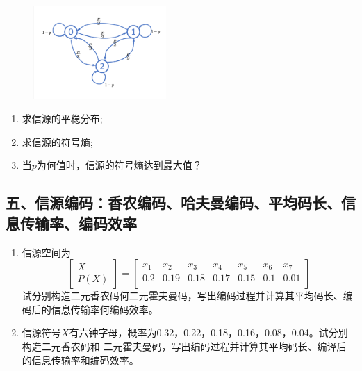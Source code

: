 \documentclass[normal,cyan]{elegantnote}
\begin{document}
\begin{enumerate}
    \begin{figure}[H]
        \centering
        \includegraphics[width=0.45\textwidth]{figure/fig4.pdf}
    \end{figure}
    \begin{enumerate}
        \item 求信源的平稳分布;
        \vspace*{0.3cm}
        \item 求信源的符号熵;
        \vspace*{0.3cm}
        \item 当$p$为何值时，信源的符号熵达到最大值？
    \end{enumerate}
\end{enumerate}
\subsection*{五、信源编码：香农编码、哈夫曼编码、平均码长、信息传输率、编码效率}
\begin{enumerate}
    \item 信源空间为
    $$
    \begin{bmatrix}
        X\\
        P(X)
    \end{bmatrix} = \begin{bmatrix}
        x_1 & x_2 & x_3 & x_4 & x_5 & x_6 & x_7\\
        0.2 & 0.19 & 0.18 & 0.17 & 0.15 & 0.1 & 0.01\\
    \end{bmatrix}
    $$
    试分别构造二元香农码何二元霍夫曼码，写出编码过程并计算其平均码长、编码后的信息传输率何编码效率。
    \vspace*{0.8cm}
    \item 信源符号$X$有六钟字母，概率为0.32，0.22，0.18，0.16，0.08，0.04。试分别构造二元香农码和
    二元霍夫曼码，写出编码过程并计算其平均码长、编译后的信息传输率和编码效率。

\end{enumerate}
\end{document}
